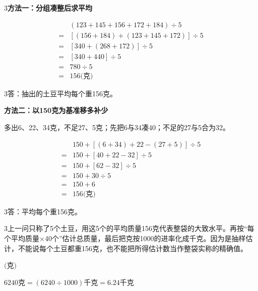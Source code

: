 \documentclass[multi=snippet,border={5bp 20bp 5bp 5bp}]{standalone}
\newenvironment{snippet}[3]{\begin{minipage}{#1bp}\color{answerred}\fontsize{#2}{#3}\selectfont\raggedright}{\end{minipage}}
\begin{document}
\begin{snippet}{505}{11.5}{14}\begin{multicols}{3}\raggedcolumns \textbf{方法一：分组凑整后求平均}\end{multicols}\[\begin{aligned}&(123+145+156+172+184)\div5\\={}&[(156+184)+(123+145+172)]\div5\\={}&[340+(268+172)]\div5\\={}&[340+440]\div5\\={}&780\div5\\={}&156\text{(克)}\end{aligned}\]\begin{multicols}{3}\raggedcolumns 答：抽出的土豆平均每个重156克。\par \textbf{方法二：以150克为基准移多补少}\par 多出6、22、34克，不足27、5克；先把6与34凑40；不足的27与5合为32。\end{multicols}\[\begin{aligned}&150+[(6+34)+22-(27+5)]\div5\\={}&150+[40+22-32]\div5\\={}&150+[62-32]\div5\\={}&150+30\div5\\={}&150+6\\={}&156\text{(克)}\end{aligned}\]\begin{multicols}{3}\raggedcolumns 答：平均每个重156克。\end{multicols}\end{snippet}
\begin{snippet}{505}{11.5}{14}\begin{multicols}{3}\raggedcolumns 上一问只称了5个土豆，用这5个的平均质量156克代表整袋的大致水平。再按“每个平均质量×40个”估计总质量，最后把克按1000的进率化成千克。因为是抽样估计，不能说每个土豆都重156克，也不能把所得估计数当作整袋实称的精确值。\end{multicols}\end{snippet}
\begin{snippet}{80}{9.0}{14}\SourceSans\setlength{\mathindent}{2bp}\(\text{(克)}\)\end{snippet}
\begin{snippet}{505}{9}{14}\SourceSans\setlength{\mathindent}{2bp}\(6240\text{克}=(6240\div1000)\text{千克}=6.24\text{千克}\)\end{snippet}
\end{document}
